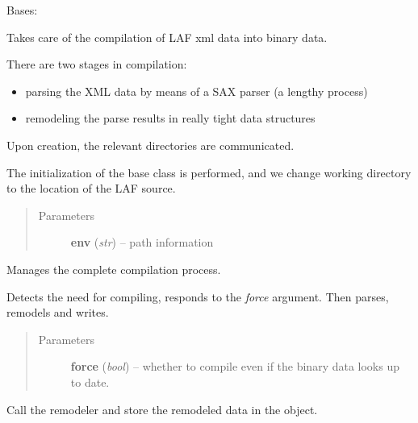 \documentclass[letterpaper,10pt,english]{sphinxmanual}
\begin{document}
\begin{fulllineitems}
\label{graf/graf:graf.GrafCompiler}
Bases: {\hyperref[graf/graf:graf.graf.Graf]{}}

Takes care of the compilation of LAF xml data into binary data.

There are two stages in compilation:
\begin{itemize}
\item {} 
parsing the XML data by means of a SAX parser (a lengthy process)

\item {} 
remodeling the parse results in really tight data structures

\end{itemize}

Upon creation, the relevant directories are communicated.

The initialization of the base class is performed, and we change working directory to the location of the LAF source.
\begin{quote}\begin{description}
\item[{Parameters}] \leavevmode
\textbf{env} (\emph{str}) --
path information

\end{description}\end{quote}

\begin{fulllineitems}
\label{graf/graf:graf.GrafCompiler.compiler}
Manages the complete compilation process.

Detects the need for compiling, responds to the \emph{force} argument. Then parses, remodels and writes.
\begin{quote}\begin{description}
\item[{Parameters}] \leavevmode
\textbf{force} (\emph{bool}) --
whether to compile even if the binary data looks up to date.

\end{description}\end{quote}

\end{fulllineitems}


\begin{fulllineitems}
\label{graf/graf:graf.GrafCompiler.model}
Call the remodeler and store the remodeled data in the object.


\end{fulllineitems}
\end{fulllineitems}
\end{document}

